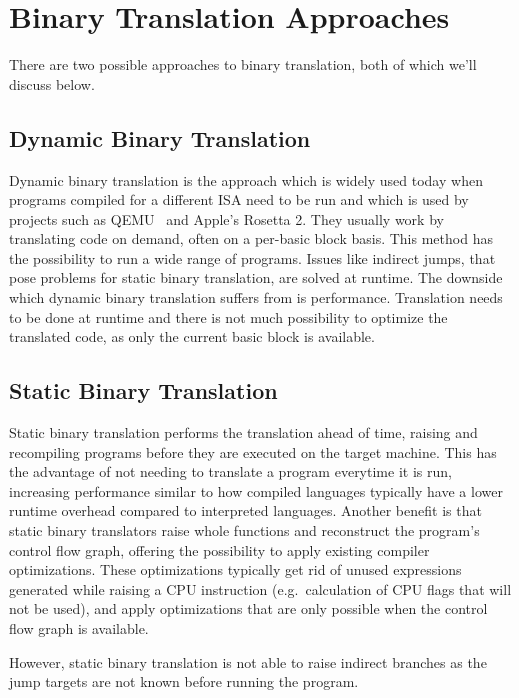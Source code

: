 \section{Binary Translation Approaches}\label{sec:binary-translation-approaches}

There are two possible approaches to binary translation, both of which we'll discuss below.

\subsection{Dynamic Binary Translation}\label{subsec:dynamic-binary-translation}

Dynamic binary translation is the approach which is widely used today when programs compiled for a different \gls{ISA} need to be run and which is used by projects such as QEMU~\parencite{bellard2005qemu} and Apple's Rosetta 2.
They usually work by translating code on demand, often on a per-basic block basis.
This method has the possibility to run a wide range of programs.
Issues like indirect jumps, that pose problems for static binary translation, are solved at runtime.
The downside which dynamic binary translation suffers from is performance.
Translation needs to be done at runtime and there is not much possibility to optimize the translated code, as only the current basic block is available.

\subsection{Static Binary Translation}\label{subsec:static-binary-translation}

Static binary translation performs the translation ahead of time, raising and recompiling programs before they are executed on the target machine.
This has the advantage of not needing to translate a program everytime it is run, increasing performance similar to how compiled languages typically have a lower runtime overhead compared to interpreted languages.
Another benefit is that static binary translators raise whole functions and reconstruct the program's control flow graph, offering the possibility to apply existing compiler optimizations.
These optimizations typically get rid of unused expressions generated while raising a CPU instruction (e.g.\ calculation of CPU flags that will not be used), and apply optimizations that are only possible when the control flow graph is available.

However, static binary translation is not able to raise indirect branches as the jump targets are not known before running the program.
